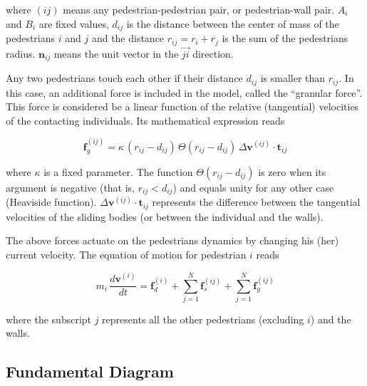 \noindent where $(ij)$ means any pedestrian-pedestrian pair, or pedestrian-wall 
pair. $A_i$ and $B_i$ are fixed values, $d_{ij}$ is the distance between  the 
center of mass of the pedestrians $i$ and $j$ and the distance $r_{ij}=r_i+r_j$ 
is the sum of the pedestrians radius. $\mathbf{n}_{ij}$ means the unit vector in 
the $\vec{ji}$ direction. 

Any two pedestrians touch each other if their distance $d_{ij}$ is smaller than 
$r_{ij}$.  In this case, an additional force is included in the model, called 
the ``granular force''. This force is considered be a linear function of the 
relative (tangential) velocities of the contacting individuals. Its mathematical 
expression reads 

\begin{equation}
        \mathbf{f}_g^{(ij)} = 
\kappa\,(r_{ij}-d_{ij})\,\Theta(r_{ij}-d_{ij})\,\Delta
\mathbf{v}^{(ij)}\cdot\mathbf{t}_{ij} 
        \label{granular}
\end{equation}

\noindent where $\kappa$ is a fixed parameter. The function 
$\Theta(r_{ij}-d_{ij})$ is zero when its argument is negative (that is, 
$r_{ij}<d_{ij}$) and equals unity for any other case (Heaviside function). 
$\Delta\mathbf{v}^{(ij)}\cdot\mathbf{t}_{ij}$ represents the difference between 
the tangential velocities of the sliding bodies (or between the individual and 
the walls).   

The above forces actuate on the pedestrians dynamics by changing his (her) 
current velocity. The equation of motion for pedestrian $i$ reads

\begin{equation}
m_i\,\displaystyle\frac{d\mathbf{v}^{(i)}}{dt}=\mathbf{f}_d^{(i)}
+\displaystyle\sum_{j=1}^{N}\displaystyle\mathbf{f}_s^{(ij)}
+\displaystyle\sum_ {
j=1}^{N}\mathbf{f}_g^{(ij)}\label{eq_mov}
\end{equation}

\noindent where the subscript $j$ represents all the other pedestrians 
(excluding $i$) and the walls. 

\subsection{\label{fundamental-diagram} Fundamental Diagram}



